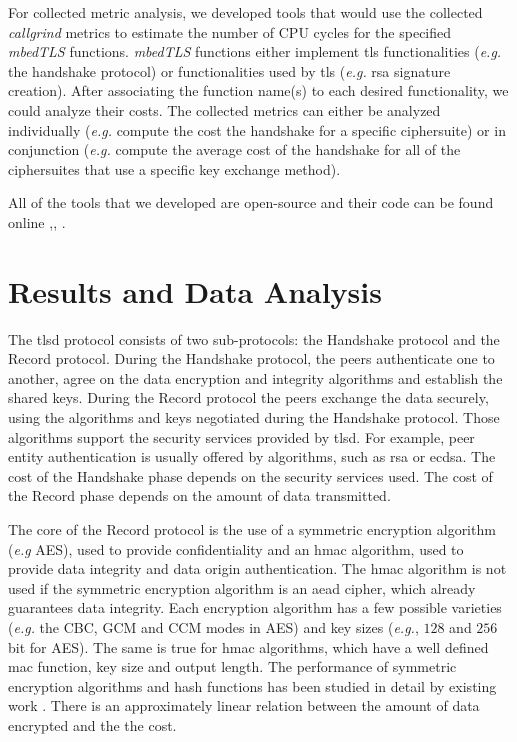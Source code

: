 \documentclass{llncs}
\begin{document}
For collected metric analysis, we developed tools that would use the collected \textit{callgrind} metrics to estimate the
number of CPU cycles for the specified \textit{mbedTLS} functions. \textit{mbedTLS} functions either implement \gls{tls} functionalities
(\textit{e.g.} the handshake protocol) or functionalities used by \gls{tls} (\textit{e.g.} \gls{rsa} signature creation).
After associating the function name(s) to each desired functionality, we could analyze their costs. The collected metrics can either
be analyzed individually (\textit{e.g.} compute the cost the handshake for a specific ciphersuite) or in conjunction (\textit{e.g.}
compute the average cost of the handshake for all of the ciphersuites that use a specific key exchange method).

All of the tools that we developed are open-source and their code can be found online \cite{iluxonch23:online},\cite{iluxonch44:online}, \cite{iluxonch73:online}.


\section{Results and Data Analysis}

The \gls{tlsd} protocol consists of two sub-protocols: the Handshake protocol and the Record protocol.
During the Handshake protocol, the peers authenticate one to another, agree on the data encryption and integrity
algorithms and establish the shared keys. During the Record protocol the peers exchange the data securely,
using the algorithms and keys negotiated during the Handshake protocol. Those algorithms support the security
services provided by \gls{tlsd}. For example, peer entity authentication is usually offered by algorithms, such
as \gls{rsa} or \gls{ecdsa}. The cost of the Handshake phase depends on the security services used. The cost
of the Record phase depends on the amount of data transmitted.

The core of the Record protocol is the use of a symmetric encryption algorithm (\textit{e.g} AES), used to
provide confidentiality and an \gls{hmac} algorithm, used to provide data integrity and data origin authentication.
The \gls{hmac} algorithm is not used if the symmetric encryption algorithm is an \gls{aead} cipher, which already
guarantees data integrity. Each encryption algorithm has a few possible varieties (\textit{e.g.} the CBC, GCM and CCM modes in AES)
and key sizes  (\textit{e.g.}, $128$ and $256$ bit for AES). The same is true for \gls{hmac} algorithms, which
have a well defined \gls{mac} function, key size and output length. The performance of symmetric encryption
algorithms and hash functions has been studied in detail by existing work \cite{nadeem2005performance} \cite{mathew2010performance}.
There is an approximately linear relation between the amount of data encrypted and the the cost.
\end{document}

